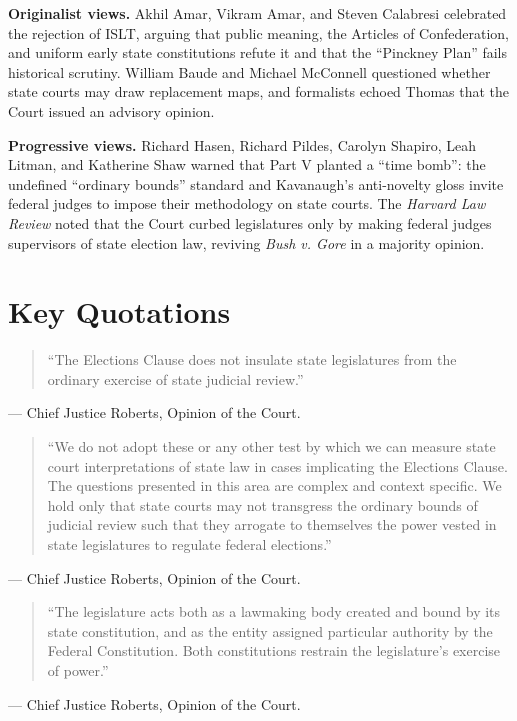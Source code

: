 \documentclass[12pt]{article}
\begin{document}
\textbf{Originalist views.} Akhil Amar, Vikram Amar, and Steven Calabresi celebrated the rejection of ISLT, arguing that public meaning, the Articles of Confederation, and uniform early state constitutions refute it and that the ``Pinckney Plan'' fails historical scrutiny. William Baude and Michael McConnell questioned whether state courts may draw replacement maps, and formalists echoed Thomas that the Court issued an advisory opinion.

\textbf{Progressive views.} Richard Hasen, Richard Pildes, Carolyn Shapiro, Leah Litman, and Katherine Shaw warned that Part V planted a ``time bomb'': the undefined ``ordinary bounds'' standard and Kavanaugh's anti-novelty gloss invite federal judges to impose their methodology on state courts. The \textit{Harvard Law Review} noted that the Court curbed legislatures only by making federal judges supervisors of state election law, reviving \textit{Bush v. Gore} in a majority opinion.

\section{Key Quotations}

\begin{quote}
``The Elections Clause does not insulate state legislatures from the ordinary exercise of state judicial review.''
\end{quote}
\noindent --- Chief Justice Roberts, Opinion of the Court.

\begin{quote}
``We do not adopt these or any other test by which we can measure state court interpretations of state law in cases implicating the Elections Clause. The questions presented in this area are complex and context specific. We hold only that state courts may not transgress the ordinary bounds of judicial review such that they arrogate to themselves the power vested in state legislatures to regulate federal elections.''
\end{quote}
\noindent --- Chief Justice Roberts, Opinion of the Court.

\begin{quote}
``The legislature acts both as a lawmaking body created and bound by its state constitution, and as the entity assigned particular authority by the Federal Constitution. Both constitutions restrain the legislature's exercise of power.''
\end{quote}
\noindent --- Chief Justice Roberts, Opinion of the Court.
\end{document}
